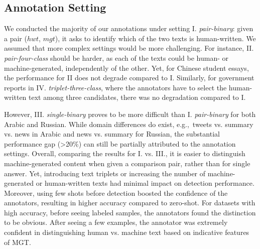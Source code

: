 \subsection{Annotation Setting}
We conducted the majority of our annotations under setting I. \emph{pair-binary}: given a pair ($hwt$, $mgt$), it asks to identify which of the two texts is human-written. 
We assumed that more complex settings would be more challenging. For instance, II. \emph{pair-four-class} should be harder, as each of the texts could be human- or machine-generated, independently of the other. %
Yet, for Chinese student essays, the performance for II does not degrade compared to I.
Similarly, for government reports in IV. \emph{triplet-three-class}, where the annotators have to select the human-written text among three candidates, there was no degradation compared to I.  

However, III. \emph{single-binary} proves to be more difficult than I. \emph{pair-binary} for both Arabic and Russian. While domain differences do exist, e.g.,~tweets vs. summary vs. news in Arabic and news vs. summary for Russian, the substantial performance gap (>20\%) can still be partially attributed to the annotation settings.
Overall, comparing the results for I. vs. III., it is easier to distinguish machine-generated content when given a comparison pair, rather than for single answer. Yet, introducing text triplets or increasing the number of machine-generated or human-written texts had minimal impact on detection performance. 
Moreover, using few shots before detection boosted the confidence of the annotators, resulting in higher accuracy compared to zero-shot.
For datasets with high accuracy, before seeing labeled samples, the annotators found the distinction to be obvious. After seeing a few examples, the annotator was extremely confident in distinguishing human vs. machine text based on indicative features of MGT. 




